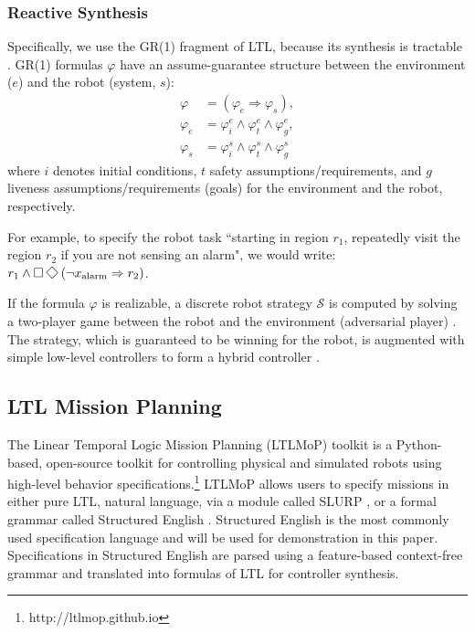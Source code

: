 \subsubsection*{Reactive Synthesis}
Specifically, we use the GR(1) fragment of LTL, because its synthesis is tractable \cite{piterman_06}. GR(1) formulas $\varphi$ have an assume-guarantee structure between the environment ($e$) and the robot (system, $s$):
\begin{align*}
	\varphi &= (\varphi_e \Rightarrow \varphi_s),\\
	\varphi_e &= \varphi_i^e \wedge \varphi_t^e \wedge \varphi_g^e,\\
	\varphi_s &= \varphi_i^s \wedge \varphi_t^s \wedge \varphi_g^s
\end{align*}
where $i$ denotes initial conditions, $t$ safety assumptions/requirements, and $g$ liveness assumptions/requirements (goals) for the environment and the robot, respectively.

For example, to specify the robot task ``starting in region $r_1$, repeatedly visit the region $r_2$ if you are not sensing an alarm", we would write: $r_1 \wedge \G\F \left(\neg x_{\text{alarm}} \Rightarrow  r_2 \right)$.

If the formula $\varphi$ is realizable, a discrete robot strategy $\mathcal{S}$ is computed by solving a two-player game between the robot and the environment (adversarial player) \cite{piterman_06}. The strategy, which is guaranteed to be winning for the robot, is augmented with simple low-level controllers to form a hybrid controller \cite{KGFP_TRO09}.

\subsection{LTL Mission Planning}\label{preliminariesB}

The Linear Temporal Logic Mission Planning (LTLMoP) toolkit \cite{Finucane2010} is a Python-based, open-source toolkit for controlling physical and simulated robots using high-level behavior specifications.\footnote{http://ltlmop.github.io} 
LTLMoP allows users to specify missions in either pure LTL, natural language, via a module called SLURP \cite{RamanRSS2013}, or a formal grammar called Structured English \cite{JFRKGICRA12}. Structured English is the most commonly used specification language and will be used for demonstration in this paper. Specifications in Structured English are parsed using a feature-based context-free grammar and translated into formulas of LTL for controller synthesis. 
